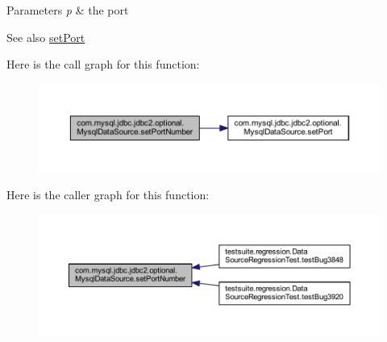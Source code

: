\begin{DoxyParams}{Parameters}
{\em p} & the port\\
\hline
\end{DoxyParams}
\begin{DoxySeeAlso}{See also}
\mbox{\hyperlink{classcom_1_1mysql_1_1jdbc_1_1jdbc2_1_1optional_1_1_mysql_data_source_aa25877765807da50745af91b24e38da0}{set\+Port}} 
\end{DoxySeeAlso}
Here is the call graph for this function\+:
\nopagebreak
\begin{figure}[H]
\begin{center}
\leavevmode
\includegraphics[width=350pt]{classcom_1_1mysql_1_1jdbc_1_1jdbc2_1_1optional_1_1_mysql_data_source_a18cf8b4b24e11ab5df45f4f9dc82d3aa_cgraph}
\end{center}
\end{figure}
Here is the caller graph for this function\+:
\nopagebreak
\begin{figure}[H]
\begin{center}
\leavevmode
\includegraphics[width=350pt]{classcom_1_1mysql_1_1jdbc_1_1jdbc2_1_1optional_1_1_mysql_data_source_a18cf8b4b24e11ab5df45f4f9dc82d3aa_icgraph}
\end{center}
\end{figure}
\mbox{\label{classcom_1_1mysql_1_1jdbc_1_1jdbc2_1_1optional_1_1_mysql_data_source_a49e5afebf285cf08c2f2fae76d63aba4}} 
